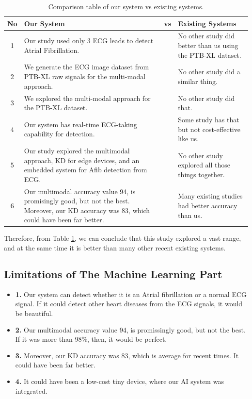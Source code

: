 \documentclass[conference]{IEEEtran}
\begin{document}
\begin{table}[!ht]
\centering
\caption{Comparison table of our system vs existing systems.}
\begin{tabularx}{\columnwidth}{|c|X|c|X|}
\hline
No & Our System & vs & Existing Systems \\ \hline
1 & Our study used only 3 ECG leads to detect Atrial Fibrillation. & & No other study did better than us using the PTB-XL dataset.\\ 
\hline
2 & We generate the ECG image dataset from PTB-XL raw signals for the multi-modal approach. & & No other study did a similar thing. \\ 
\hline
3 & We explored the multi-modal approach for the PTB-XL dataset. & & No other study did that.\\ 
\hline
4 & Our system has real-time ECG-taking capability for detection. & & Some study has that but not cost-effective like us. \\ 
\hline
5 & Our study explored the multimodal approach, KD for edge devices, and an embedded system for Afib detection from ECG. & & No other study explored all those things together.\\ 
\hline
6 & Our multimodal accuracy value 94, is promisingly good, but not the best. Moreover, our KD accuracy was 83, which could have been far better. & & Many existing studies had better accuracy than us.  \\ 
\hline
\end{tabularx}
\label{tab:comparison vs other study}
\end{table}

Therefore, from Table \ref{tab:comparison vs other study}, we can conclude that this study explored a vast range, and at the same time it is better than many other recent existing systems.

\subsection{Limitations of The Machine Learning Part}

\begin{itemize}
    \item \textbf{1.} Our system can detect whether it is an Atrial fibrillation or a normal ECG signal. If it could detect other heart diseases from the ECG signals, it would be beautiful.
    \item \textbf{2.} Our multimodal accuracy value 94, is promissingly good, but not the best. If it was more than 98\%, then, it would be perfect.
    \item \textbf{3.} Moreover, our KD accuracy was 83, which is average for recent times. It could have been far better.
    \item \textbf{4.} It could have been a low-cost tiny device, where our AI system was integrated.
\end{itemize}
\end{document}
